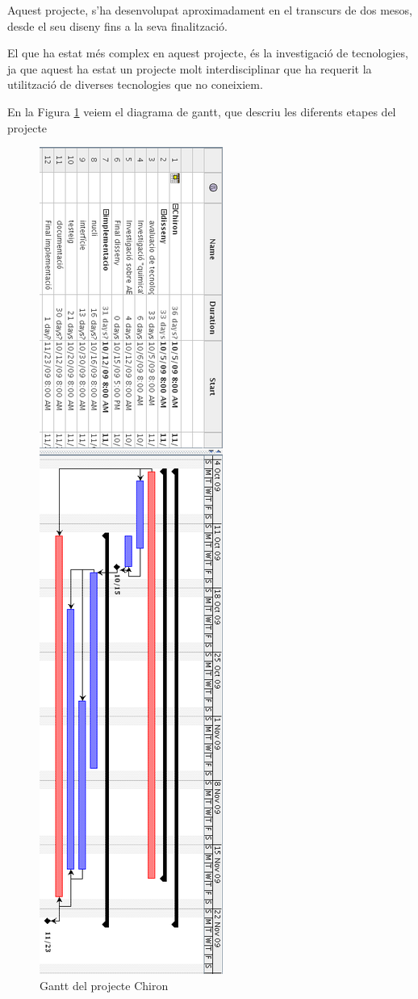 Aquest projecte, s'ha desenvolupat aproximadament en el transcurs de dos mesos,
desde el seu diseny fins a la seva finalització.  

El que ha estat més complex en aquest projecte, és la investigació de
tecnologies, ja que aquest ha estat un projecte molt interdisciplinar que ha
requerit la utilització de diverses tecnologies que no coneixiem.

En la Figura \ref{fig:chiron-gantt} veiem el diagrama de gantt, que descriu les
diferents etapes del projecte 

\begin{figure}[h]
	\begin{center}
		\includegraphics[scale=0.5]{chiron/chiron-gantt.png}
	\end{center}
	\caption{Gantt del projecte Chiron}
	\label{fig:chiron-gantt}
\end{figure}

